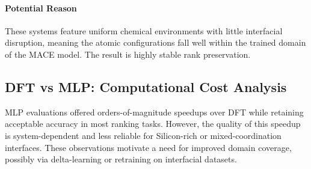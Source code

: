 \paragraph{Potential Reason}

These systems feature uniform chemical environments with little interfacial disruption, meaning the atomic configurations fall well within the trained domain of the MACE model. The result is highly stable rank preservation.

\subsection{DFT vs MLP: Computational Cost Analysis}

MLP evaluations offered orders-of-magnitude speedups over DFT while retaining acceptable accuracy in most ranking tasks. However, the quality of this speedup is system-dependent and less reliable for Silicon-rich or mixed-coordination interfaces. These observations motivate a need for improved domain coverage, possibly via delta-learning or retraining on interfacial datasets. 